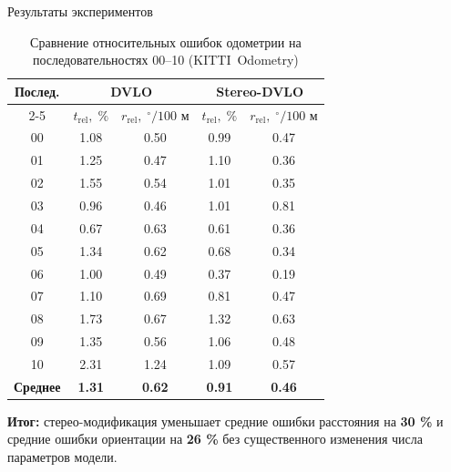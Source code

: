\documentclass{beamer} %
\begin{document}
\begin{frame}{Результаты экспериментов}
  \footnotesize

  \begin{table}
    \caption{Сравнение относительных ошибок одометрии
            на последовательностях 00–10
            (KITTI Odometry)}
      \label{tab:kitti_mono_vs_stereo}
    \begin{center}
      \begin{tabular}{|c|cc|cc|}
        \hline
        \multirow{2}{*}{Послед.} &
        \multicolumn{2}{c|}{DVLO} &
        \multicolumn{2}{c|}{Stereo-DVLO} \\
        \cline{2-5}
        & $t_{\mathrm{rel}},\;\%$ & $r_{\mathrm{rel}},\;^{\circ}/100\text{ м}$ &
          $t_{\mathrm{rel}},\;\%$ & $r_{\mathrm{rel}},\;^{\circ}/100\text{ м}$ \\ \hline
        00 & 1.08 & 0.50 & 0.99 & 0.47 \\
        01 & 1.25 & 0.47 & 1.10 & 0.36 \\
        02 & 1.55 & 0.54 & 1.01 & 0.35 \\
        03 & 0.96 & 0.46 & 1.01 & 0.81 \\
        04 & 0.67 & 0.63 & 0.61 & 0.36 \\
        05 & 1.34 & 0.62 & 0.68 & 0.34 \\
        06 & 1.00 & 0.49 & 0.37 & 0.19 \\
        07 & 1.10 & 0.69 & 0.81 & 0.47 \\
        08 & 1.73 & 0.67 & 1.32 & 0.63 \\
        09 & 1.35 & 0.56 & 1.06 & 0.48 \\
        10 & 2.31 & 1.24 & 1.09 & 0.57 \\ \hline
        \textbf{Среднее} & \textbf{1.31} & \textbf{0.62} &
        \textbf{0.91} & \textbf{0.46} \\ \hline
    \end{tabular}
    
    
    \end{center}
  \end{table}

  \vspace{6pt}

  \textbf{Итог:} стерео-модификация уменьшает средние ошибки
  расстояния на \textbf{30 \%} и средние ошибки ориентации на \textbf{26 \%} 
  без существенного изменения числа параметров модели.
\end{frame}
\end{document}
